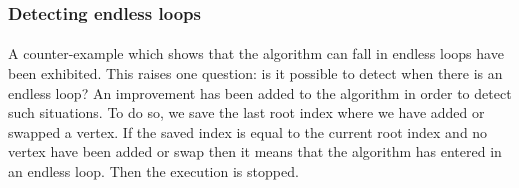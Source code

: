 \subsubsection{Detecting endless loops}
\paragraph{}
A counter-example which shows that the algorithm can fall in endless loops have
been exhibited. This raises one question: is it possible to detect when there
is an endless loop? An improvement has been added to the algorithm in order to
detect such situations. To do so, we save the last root index where we have
added or swapped a vertex. If the saved index is equal to the current root index
and no vertex have been added or swap then it means that the algorithm has
entered in an endless loop. Then the execution is stopped.
